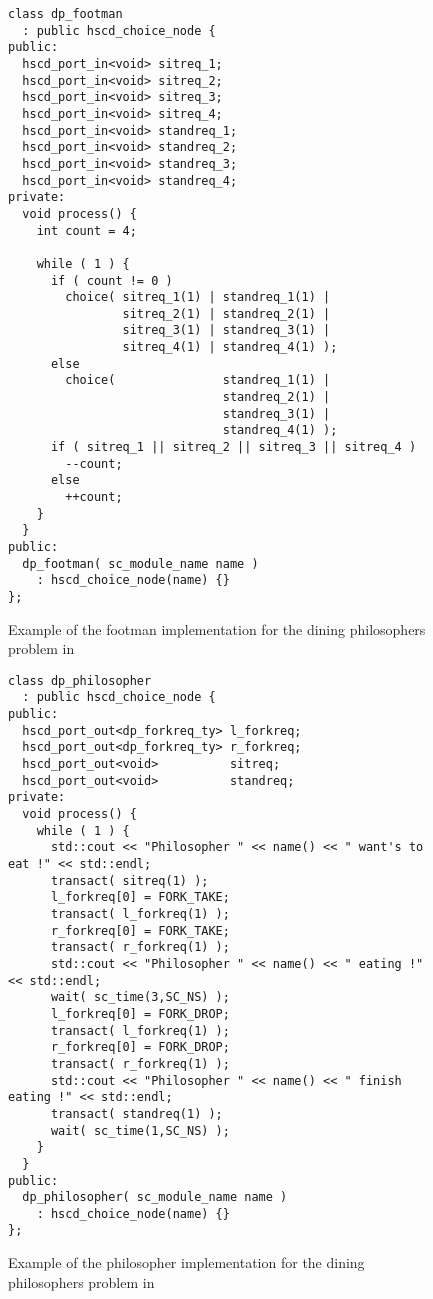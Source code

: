\begin{figure}
\centering
\begin{verbatim}
class dp_footman
  : public hscd_choice_node {
public:
  hscd_port_in<void> sitreq_1;
  hscd_port_in<void> sitreq_2;
  hscd_port_in<void> sitreq_3;
  hscd_port_in<void> sitreq_4;
  hscd_port_in<void> standreq_1;
  hscd_port_in<void> standreq_2;
  hscd_port_in<void> standreq_3;
  hscd_port_in<void> standreq_4;
private:
  void process() {
    int count = 4;
    
    while ( 1 ) {
      if ( count != 0 )
        choice( sitreq_1(1) | standreq_1(1) |
                sitreq_2(1) | standreq_2(1) |
                sitreq_3(1) | standreq_3(1) |
                sitreq_4(1) | standreq_4(1) );
      else
        choice(               standreq_1(1) |
                              standreq_2(1) |
                              standreq_3(1) |
                              standreq_4(1) );
      if ( sitreq_1 || sitreq_2 || sitreq_3 || sitreq_4 )
        --count;
      else
        ++count;
    }
  }
public:
  dp_footman( sc_module_name name )
    : hscd_choice_node(name) {}
};
\end{verbatim}
\caption{\label{dining-philosophers-csp-systemoc}
  Example of the footman implementation for the
  dining philosophers problem in \SysteMoC{}}
\end{figure}


\begin{figure}
\centering
\begin{verbatim}
class dp_philosopher
  : public hscd_choice_node {
public:
  hscd_port_out<dp_forkreq_ty> l_forkreq;
  hscd_port_out<dp_forkreq_ty> r_forkreq;
  hscd_port_out<void>          sitreq;
  hscd_port_out<void>          standreq;
private:
  void process() {
    while ( 1 ) {
      std::cout << "Philosopher " << name() << " want's to eat !" << std::endl;
      transact( sitreq(1) );
      l_forkreq[0] = FORK_TAKE;
      transact( l_forkreq(1) );
      r_forkreq[0] = FORK_TAKE;
      transact( r_forkreq(1) );
      std::cout << "Philosopher " << name() << " eating !" << std::endl;
      wait( sc_time(3,SC_NS) );
      l_forkreq[0] = FORK_DROP;
      transact( l_forkreq(1) );
      r_forkreq[0] = FORK_DROP;
      transact( r_forkreq(1) );
      std::cout << "Philosopher " << name() << " finish eating !" << std::endl;
      transact( standreq(1) );
      wait( sc_time(1,SC_NS) );
    }
  }
public:
  dp_philosopher( sc_module_name name )
    : hscd_choice_node(name) {}
};
\end{verbatim}
\caption{\label{dining-philosophers-csp-systemoc}
  Example of the philosopher implementation for the
  dining philosophers problem in \SysteMoC{}}
\end{figure}

